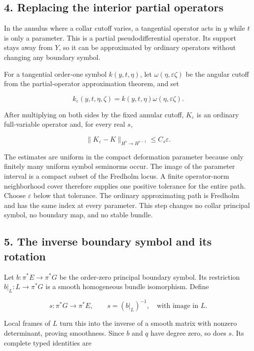 \documentclass[
  11pt,
]{article}
\begin{document}
\subsection{4. Replacing the interior partial
operators}\label{replacing-the-interior-partial-operators}

In the annulus where a collar cutoff varies, a tangential operator acts
in \(y\) while \(t\) is only a parameter. This is a partial
pseudodifferential operator. Its support stays away from \(Y\), so it
can be approximated by ordinary operators without changing any boundary
symbol.

For a tangential order-one symbol \(k(y,t,\eta)\), let
\(\omega(\eta,\varepsilon\zeta)\) be the angular cutoff from the
partial-operator approximation theorem, and set

\[
 k_\varepsilon(y,t,\eta,\zeta)
 =k(y,t,\eta)\omega(\eta,\varepsilon\zeta).
 \tag{BR15}
\]

After multiplying on both sides by the fixed annular cutoff,
\(K_\varepsilon\) is an ordinary full-variable operator and, for every
real \(s\),

\[
 \|K_\varepsilon-K\|_{H^s\to H^{s-1}}
 \leq C_s\varepsilon .
 \tag{BR16}
\]

The estimates are uniform in the compact deformation parameter because
only finitely many uniform symbol seminorms occur. The image of the
parameter interval is a compact subset of the Fredholm locus. A finite
operator-norm neighborhood cover therefore supplies one positive
tolerance for the entire path. Choose \(\varepsilon\) below that
tolerance. The ordinary approximating path is Fredholm and has the same
index at every parameter. This step changes no collar principal symbol,
no boundary map, and no stable bundle.

\subsection{5. The inverse boundary symbol and its
rotation}\label{the-inverse-boundary-symbol-and-its-rotation}

Let \(b:\pi^*E\to\pi^*G\) be the order-zero principal boundary symbol.
Its restriction \(b|_L:L\to\pi^*G\) is a smooth homogeneous bundle
isomorphism. Define

\[
 s:\pi^*G\longrightarrow\pi^*E,\qquad
 s=(b|_L)^{-1},
 \quad\text{with image in }L.
 \tag{BR17}
\]

Local frames of \(L\) turn this into the inverse of a smooth matrix with
nonzero determinant, proving smoothness. Since \(b\) and \(q\) have
degree zero, so does \(s\). Its complete typed identities are
\end{document}
